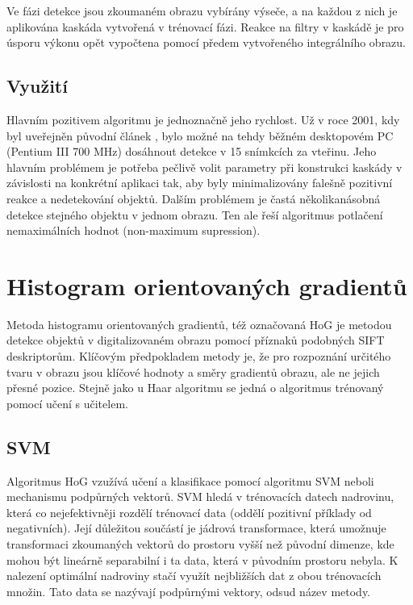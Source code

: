 	Ve fázi detekce jsou zkoumaném obrazu vybírány výseče, a na každou z nich je aplikována kaskáda vytvořená v trénovací fázi. Reakce na filtry v kaskádě je pro úsporu výkonu opět vypočtena pomocí předem vytvořeného integrálního obrazu.	
	
	\subsection{Využití}
	
	Hlavním pozitivem algoritmu je jednoznačně jeho rychlost. Už v roce 2001, kdy byl uveřejněn původní článek \cite{viola2001rapid}, bylo možné na tehdy běžném desktopovém PC (Pentium III 700 MHz) dosáhnout detekce v 15 snímkcích za vteřinu. Jeho hlavním problémem je potřeba pečlivě volit parametry při konstrukci kaskády v závislosti na konkrétní aplikaci tak, aby byly minimalizovány falešně pozitivní reakce a nedetekování objektů. Dalším problémem je častá několikanásobná detekce stejného objektu v jednom obrazu. Ten ale řeší algoritmus potlačení nemaximálních hodnot (non-maximum supression).
 
\section{Histogram orientovaných gradientů}

	Metoda histogramu orientovaných gradientů, též označovaná HoG \cite{dalal2005histograms} je metodou detekce objektů v digitalizovaném obrazu pomocí příznaků podobných SIFT deskriptorům. Klíčovým předpokladem metody je, že pro rozpoznání určitého tvaru v obrazu jsou klíčové hodnoty a směry gradientů obrazu, ale ne jejich přesné pozice. Stejně jako u Haar algoritmu se jedná o algoritmus trénovaný pomocí učení s učitelem.
	
	\subsection{SVM}
	
	Algoritmus HoG vzužívá učení a klasifikace pomocí algoritmu SVM neboli mechanismu podpůrných vektorů. SVM hledá v trénovacích datech nadrovinu, která co nejefektivněji rozdělí trénovací data (oddělí pozitivní příklady od negativních). Její důležitou součástí je jádrová transformace, která umožnuje transformaci zkoumaných vektorů do prostoru vyšší než původní dimenze, kde mohou být lineárně separabilní i ta data, která v původním prostoru nebyla. K nalezení optimální nadroviny stačí využít nejbližších dat z obou trénovacích množin. Tato data se nazývají podpůrnými vektory, odsud název metody.
	

